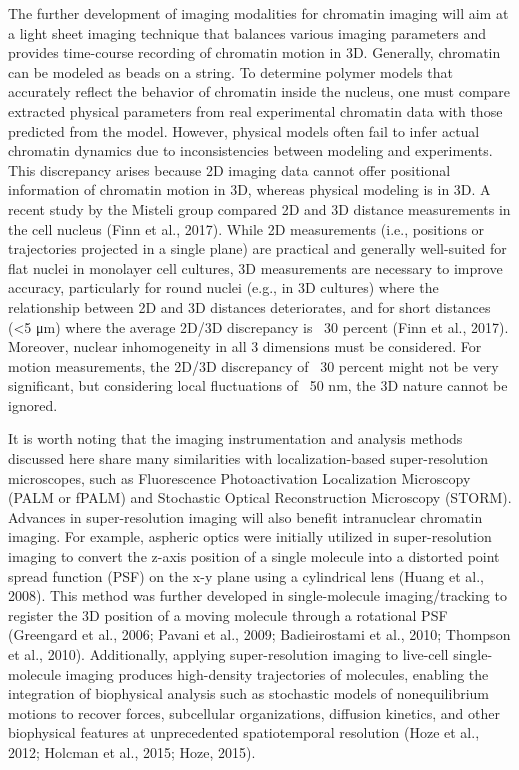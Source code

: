 The further development of imaging modalities for chromatin imaging will aim at a light sheet imaging technique that balances various imaging parameters and provides time-course recording of chromatin motion in 3D. Generally, chromatin can be modeled as beads on a string. To determine polymer models that accurately reflect the behavior of chromatin inside the nucleus, one must compare extracted physical parameters from real experimental chromatin data with those predicted from the model. However, physical models often fail to infer actual chromatin dynamics due to inconsistencies between modeling and experiments. This discrepancy arises because 2D imaging data cannot offer positional information of chromatin motion in 3D, whereas physical modeling is in 3D. A recent study by the Misteli group compared 2D and 3D distance measurements in the cell nucleus (Finn et al., 2017). While 2D measurements (i.e., positions or trajectories projected in a single plane) are practical and generally well-suited for flat nuclei in monolayer cell cultures, 3D measurements are necessary to improve accuracy, particularly for round nuclei (e.g., in 3D cultures) where the relationship between 2D and 3D distances deteriorates, and for short distances (<5 μm) where the average 2D/3D discrepancy is ~30 percent (Finn et al., 2017). Moreover, nuclear inhomogeneity in all 3 dimensions must be considered. For motion measurements, the 2D/3D discrepancy of ~30 percent might not be very significant, but considering local fluctuations of ~50 nm, the 3D nature cannot be ignored.

It is worth noting that the imaging instrumentation and analysis methods discussed here share many similarities with localization-based super-resolution microscopes, such as Fluorescence Photoactivation Localization Microscopy (PALM or fPALM) and Stochastic Optical Reconstruction Microscopy (STORM). Advances in super-resolution imaging will also benefit intranuclear chromatin imaging. For example, aspheric optics were initially utilized in super-resolution imaging to convert the z-axis position of a single molecule into a distorted point spread function (PSF) on the x-y plane using a cylindrical lens (Huang et al., 2008). This method was further developed in single-molecule imaging/tracking to register the 3D position of a moving molecule through a rotational PSF (Greengard et al., 2006; Pavani et al., 2009; Badieirostami et al., 2010; Thompson et al., 2010). Additionally, applying super-resolution imaging to live-cell single-molecule imaging produces high-density trajectories of molecules, enabling the integration of biophysical analysis such as stochastic models of nonequilibrium motions to recover forces, subcellular organizations, diffusion kinetics, and other biophysical features at unprecedented spatiotemporal resolution (Hoze et al., 2012; Holcman et al., 2015; Hoze, 2015).

